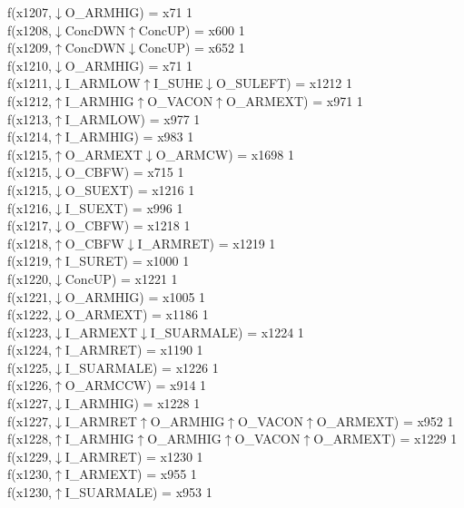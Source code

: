 f(x1207,$\downarrow$O\_ARMHIG) = x71 {1} \\
f(x1208,$\downarrow$ConcDWN$\uparrow$ConcUP) = x600 {1} \\
f(x1209,$\uparrow$ConcDWN$\downarrow$ConcUP) = x652 {1} \\
f(x1210,$\downarrow$O\_ARMHIG) = x71 {1} \\
f(x1211,$\downarrow$I\_ARMLOW$\uparrow$I\_SUHE$\downarrow$O\_SULEFT) = x1212 {1} \\
f(x1212,$\uparrow$I\_ARMHIG$\uparrow$O\_VACON$\uparrow$O\_ARMEXT) = x971 {1} \\
f(x1213,$\uparrow$I\_ARMLOW) = x977 {1} \\
f(x1214,$\uparrow$I\_ARMHIG) = x983 {1} \\
f(x1215,$\uparrow$O\_ARMEXT$\downarrow$O\_ARMCW) = x1698 {1} \\
f(x1215,$\downarrow$O\_CBFW) = x715 {1} \\
f(x1215,$\downarrow$O\_SUEXT) = x1216 {1} \\
f(x1216,$\downarrow$I\_SUEXT) = x996 {1} \\
f(x1217,$\downarrow$O\_CBFW) = x1218 {1} \\
f(x1218,$\uparrow$O\_CBFW$\downarrow$I\_ARMRET) = x1219 {1} \\
f(x1219,$\uparrow$I\_SURET) = x1000 {1} \\
f(x1220,$\downarrow$ConcUP) = x1221 {1} \\
f(x1221,$\downarrow$O\_ARMHIG) = x1005 {1} \\
f(x1222,$\downarrow$O\_ARMEXT) = x1186 {1} \\
f(x1223,$\downarrow$I\_ARMEXT$\downarrow$I\_SUARMALE) = x1224 {1} \\
f(x1224,$\uparrow$I\_ARMRET) = x1190 {1} \\
f(x1225,$\downarrow$I\_SUARMALE) = x1226 {1} \\
f(x1226,$\uparrow$O\_ARMCCW) = x914 {1} \\
f(x1227,$\downarrow$I\_ARMHIG) = x1228 {1} \\
f(x1227,$\downarrow$I\_ARMRET$\uparrow$O\_ARMHIG$\uparrow$O\_VACON$\uparrow$O\_ARMEXT) = x952 {1} \\
f(x1228,$\uparrow$I\_ARMHIG$\uparrow$O\_ARMHIG$\uparrow$O\_VACON$\uparrow$O\_ARMEXT) = x1229 {1} \\
f(x1229,$\downarrow$I\_ARMRET) = x1230 {1} \\
f(x1230,$\uparrow$I\_ARMEXT) = x955 {1} \\
f(x1230,$\uparrow$I\_SUARMALE) = x953 {1} \\
